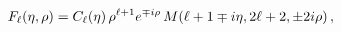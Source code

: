 \[\mathop{F_{\ell}\/}\nolimits\!\left(\eta,\rho\right)=\mathop{C_{\ell}\/}%
\nolimits\!\left(\eta\right)\rho^{\ell+1}e^{\mp i\rho}\mathop{M\/}\nolimits\!%
\left(\ell+1\mp i\eta,2\ell+2,\pm 2i\rho\right),\]